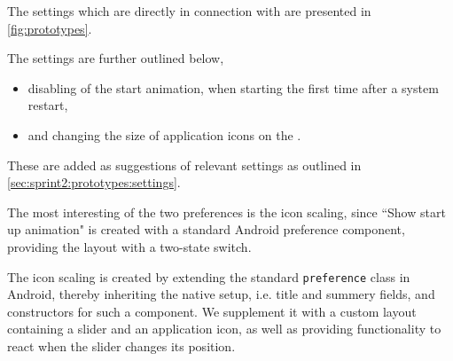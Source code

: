 The settings which are directly in connection with \launcher are presented in \cref{fig:prototypes}.

The settings are further outlined below,
\begin{itemize}
 	\item disabling of the start animation, when starting \launcher the first time after a system restart,
 	\item and changing the size of application icons on the \homeactivity.
\end{itemize} 

These are added as suggestions of relevant \launcher settings as outlined in \cref{sec:sprint2:prototypes:settings}.

The most interesting of the two preferences is the icon scaling, since ``Show start up animation" is created with a standard Android preference component, providing the layout with a two-state switch.

The icon scaling is created by extending the standard \lstinline|preference| class in Android, thereby inheriting the native setup, i.e. title and summery fields, and constructors for such a component.
We supplement it with a custom layout containing a slider and an application icon, as well as providing functionality to react when the slider changes its position.